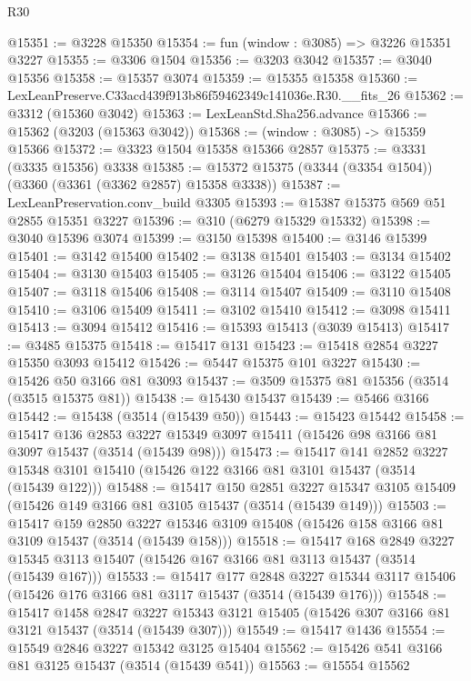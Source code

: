 \begin{lexlean}{R30}
\begin{coremodule}
@15351 := @3228 @15350
@15354 := fun (window : @3085) => @3226 @15351 @3227
@15355 := @3306 @1504
@15356 := @3203 @3042
@15357 := @3040 @15356
@15358 := @15357 @3074
@15359 := @15355 @15358
@15360 := LexLeanPreserve.C33acd439f913b86f59462349c141036e.R30.__fits_26
@15362 := @3312 (@15360 @3042)
@15363 := LexLeanStd.Sha256.advance
@15366 := @15362 (@3203 (@15363 @3042))
@15368 := (window : @3085) -> @15359 @15366
@15372 := @3323 @1504 @15358 @15366 @2857
@15375 := @3331 (@3335 @15356) @3338
@15385 := @15372 @15375 (@3344 (@3354 @1504)) (@3360 (@3361 (@3362 @2857) @15358 @3338))
@15387 := LexLeanPreservation.conv_build @3305
@15393 := @15387 @15375 @569 @51 @2855 @15351 @3227
@15396 := @310 (@6279 @15329 @15332)
@15398 := @3040 @15396 @3074
@15399 := @3150 @15398
@15400 := @3146 @15399
@15401 := @3142 @15400
@15402 := @3138 @15401
@15403 := @3134 @15402
@15404 := @3130 @15403
@15405 := @3126 @15404
@15406 := @3122 @15405
@15407 := @3118 @15406
@15408 := @3114 @15407
@15409 := @3110 @15408
@15410 := @3106 @15409
@15411 := @3102 @15410
@15412 := @3098 @15411
@15413 := @3094 @15412
@15416 := @15393 @15413 (@3039 @15413)
@15417 := @3485 @15375
@15418 := @15417 @131
@15423 := @15418 @2854 @3227 @15350 @3093 @15412
@15426 := @5447 @15375 @101 @3227
@15430 := @15426 @50 @3166 @81 @3093
@15437 := @3509 @15375 @81 @15356 (@3514 (@3515 @15375 @81))
@15438 := @15430 @15437
@15439 := @5466 @3166
@15442 := @15438 (@3514 (@15439 @50))
@15443 := @15423 @15442
@15458 := @15417
    @136
    @2853
    @3227
    @15349
    @3097
    @15411
    (@15426 @98 @3166 @81 @3097 @15437 (@3514 (@15439 @98)))
@15473 := @15417
    @141
    @2852
    @3227
    @15348
    @3101
    @15410
    (@15426 @122 @3166 @81 @3101 @15437 (@3514 (@15439 @122)))
@15488 := @15417
    @150
    @2851
    @3227
    @15347
    @3105
    @15409
    (@15426 @149 @3166 @81 @3105 @15437 (@3514 (@15439 @149)))
@15503 := @15417
    @159
    @2850
    @3227
    @15346
    @3109
    @15408
    (@15426 @158 @3166 @81 @3109 @15437 (@3514 (@15439 @158)))
@15518 := @15417
    @168
    @2849
    @3227
    @15345
    @3113
    @15407
    (@15426 @167 @3166 @81 @3113 @15437 (@3514 (@15439 @167)))
@15533 := @15417
    @177
    @2848
    @3227
    @15344
    @3117
    @15406
    (@15426 @176 @3166 @81 @3117 @15437 (@3514 (@15439 @176)))
@15548 := @15417
    @1458
    @2847
    @3227
    @15343
    @3121
    @15405
    (@15426 @307 @3166 @81 @3121 @15437 (@3514 (@15439 @307)))
@15549 := @15417 @1436
@15554 := @15549 @2846 @3227 @15342 @3125 @15404
@15562 := @15426 @541 @3166 @81 @3125 @15437 (@3514 (@15439 @541))
@15563 := @15554 @15562

\end{coremodule}
\end{lexlean}
